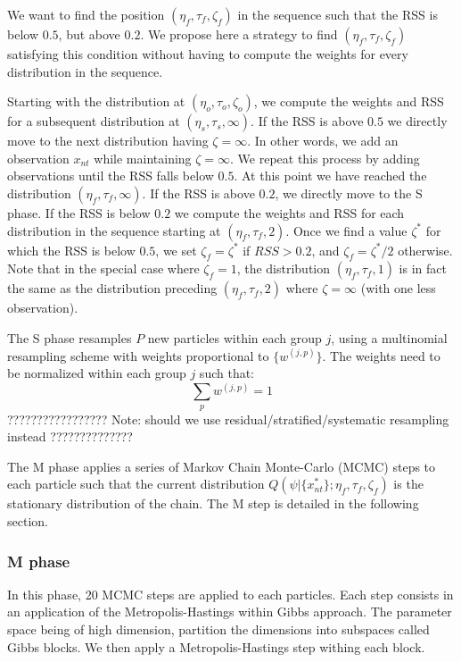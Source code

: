 \documentclass[12pt]{article}
\begin{document}
We want to find the position $(\eta_f,\tau_f,\zeta_f)$ in the sequence such that the RSS is below $0.5$, but above $0.2$. We propose here a strategy to find $(\eta_f,\tau_f,\zeta_f)$ satisfying this condition without having to compute the weights for every distribution in the sequence.

Starting with the distribution at $(\eta_o,\tau_o,\zeta_o)$, we compute the weights and RSS for a subsequent distribution at $(\eta_s,\tau_s,\infty)$. If the RSS is above $0.5$ we directly move to the next distribution having $\zeta=\infty$. In other words, we add an observation $x_{nt}$ while maintaining $\zeta=\infty$. We repeat this process by adding observations until the RSS falls below $0.5$. At this point we have reached the distribution $(\eta_f,\tau_f,\infty)$. If the RSS is above $0.2$, we directly move to the S phase. If the RSS is below $0.2$ we compute the weights and RSS for each distribution in the sequence starting at $(\eta_f,\tau_f,2)$. Once we find a value $\zeta^*$ for which the RSS is below $0.5$, we set $\zeta_f=\zeta^*$ if $RSS > 0.2$, and $\zeta_f=\zeta^*/2$ otherwise. Note that in the special case where $\zeta_f=1$, the distribution $(\eta_f,\tau_f,1)$ is in fact the same as the distribution preceding $(\eta_f,\tau_f,2)$ where $\zeta=\infty$ (with one less observation).

The S phase resamples $P$ new particles within each group $j$, using a multinomial resampling scheme with weights proportional to $\{ w^{(j,p)}\}$. The weights need to be normalized within each group $j$ such that:
$$ \sum_p  w^{(j,p)} = 1 $$ 
????????????????? Note: should we use residual/stratified/systematic resampling instead ??????????????

The M phase applies a series of Markov Chain Monte-Carlo (MCMC) steps to each particle such that the current distribution $Q(\psi|\{x_{nt}^*\};\eta_f,\tau_f,\zeta_f)$ is the stationary distribution of the chain. The M step is detailed in the following section.

\subsubsection{M phase}

In this phase, 20 MCMC steps are applied to each particles. Each step consists in an application of the Metropolis-Hastings within Gibbs approach. The parameter space being of high dimension, partition the dimensions into subspaces called Gibbs blocks. We then apply a Metropolis-Hastings step withing each block. 
\end{document}
